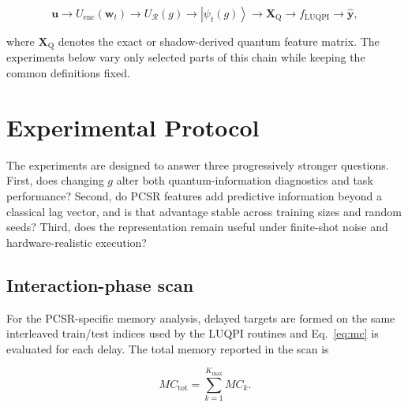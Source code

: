 \documentclass[final,1p,times]{elsarticle}
\newcommand{\ket}[1]{\left|#1\right\rangle}
\begin{document}
\begin{equation}
\bm u
\rightarrow
U_{\mathrm{enc}}(\bm w_t)
\rightarrow
U_{\mathcal R}(g)
\rightarrow
\ket{\psi_t(g)}
\rightarrow
\bm X_{\mathrm Q}
\rightarrow
f_{\mathrm{LUQPI}}
\rightarrow
\hat{\bm y},
\label{eq:pcsr_pipeline}
\end{equation}

where $\bm X_{\mathrm Q}$ denotes the exact or shadow-derived quantum
feature matrix. The experiments below vary only selected parts of this
chain while keeping the common definitions fixed.

\section{Experimental Protocol}
\label{sec:experiments}

The experiments are designed to answer three progressively stronger
questions. First, does changing $g$ alter both quantum-information
diagnostics and task performance? Second, do PCSR features add
predictive information beyond a classical lag vector, and is that
advantage stable across training sizes and random seeds? Third, does
the representation remain useful under finite-shot noise and
hardware-realistic execution?

\subsection{Interaction-phase scan}

For the PCSR-specific memory analysis, delayed targets are formed on
the same interleaved train/test indices used by the LUQPI routines and
Eq.~\eqref{eq:mc} is evaluated for each delay. The total memory
reported in the scan is

\begin{equation}
MC_{\mathrm{tot}}
=
\sum_{k=1}^{K_{\max}}MC_k.
\label{eq:mc_total}
\end{equation}
\end{document}
